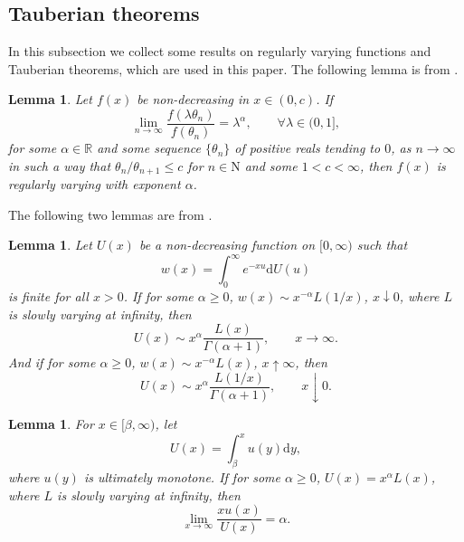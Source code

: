 \documentclass[12pt,a4paper]{amsart}
\numberwithin{equation}{section}
\theoremstyle{plain}
\newtheorem{lem}[thm]{Lemma}
\theoremstyle{definition}
\theoremstyle{remark}
\begin{document}
\subsection{Tauberian theorems}

In this subsection we collect some results on regularly varying functions and  Tauberian theorems, which are used in this paper.
The following lemma is from \cite[Appendix 13.6]{AH}.
\begin{lem}\label{lem:regu}
Let $f(x)$ be non-decreasing in $x\in (0,c)$. If
\[
\lim_{n\to\infty}\dfrac{f(\lambda\theta_n)}{f(\theta_n)}=\lambda^\alpha,\qquad \forall \lambda\in (0,1],
\]
for some $\alpha\in\mathbb R$ and some sequence $\{\theta_n\}$ of positive reals tending to $0$, as $n\to\infty$ in such a way that $\theta_n/\theta_{n+1}\leq c$ for $n\in\mathrm N$ and some $1<c<\infty$, then $f(x)$ is regularly varying with exponent $\alpha$.
\end{lem}


The following two lemmas are from \cite[Appendix 14]{AH}.
\begin{lem}\label{lem: tau}
Let $U(x)$ be a non-decreasing function on $[0,\infty)$ such that
\[
w(x)=\int_0^\infty e^{-xu} \mathrm dU(u)
\]
is finite for all $x>0$. If for some $\alpha\geq 0$, $w(x)\sim x^{-\alpha}L(1/x)$, $x\downarrow 0$, where $L$ is slowly varying at infinity, then
\[
U(x)\sim x^{\alpha}\dfrac{L(x)}{\Gamma(\alpha+1)},\qquad x\to\infty.
\]
 And if for some $\alpha\geq 0$, $w(x)\sim x^{-\alpha}L(x)$, $x\uparrow \infty$, then
\[
U(x)\sim x^{\alpha}\dfrac{L(1/x)}{\Gamma(\alpha+1)},\qquad x\downarrow 0.
\]
\end{lem}

\begin{lem}\label{lem:tail}
For $x\in [\beta,\infty)$, let
\[
U(x)=\int_\beta^xu(y)\mathrm dy,
\]
where $u(y)$ is ultimately monotone.  If for some $\alpha\geq 0$, $U(x)=x^\alpha L(x)$,  where $L$ is slowly varying at infinity, then
\[
\lim_{x\to\infty}\dfrac{xu(x)}{U(x)}=\alpha.
\]
\end{lem}
\end{document}
